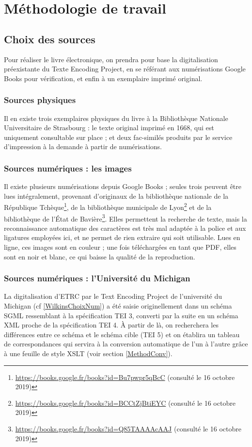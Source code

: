 \chapter{Méthodologie de travail}\label{Method}
\section{Choix des sources}\label{MethodSource}
Pour réaliser le livre électronique, on prendra pour base la digitalisation préexistante du Texte Encoding Project, en se référant aux numérisations Google Books pour vérification, et enfin à un exemplaire imprimé original.
\subsection{Sources physiques}
Il en existe trois exemplaires physiques du livre à la Bibliothèque Nationale Universitaire de Strasbourg : le texte original imprimé en 1668, qui est uniquement consultable sur place ; et deux fac-similés produits par le service d'impression à la demande à partir de numérisations.
\subsection{Sources numériques : les images}
Il existe plusieurs numérisations depuis Google Books ; seules trois peuvent être lues intégralement, provenant d'originaux de la bibliothèque nationale de la République Tchèque\footnote{\url{https://books.google.fr/books?id=Bu7pwpr5qBcC} (consulté le 16 octobre 2019)}, de la bibliothèque municipale de Lyon\footnote{\url{https://books.google.fr/books?id=BCCtZjBtiEYC} (consulté le 16 octobre 2019)} et de la bibliothèque de l'État de Bavière\footnote{\url{https://books.google.fr/books?id=Q85TAAAAcAAJ} (consulté le 16 octobre 2019)}.
Elles permettent la recherche de texte, mais la reconnaissance automatique des caractères est très mal adaptée à la police et aux ligatures employées ici, et ne permet de rien extraire qui soit utilisable.
Lues en ligne, ces images sont en couleur ; une fois téléchargées en tant que PDF, elles sont en noir et blanc, ce qui baisse la qualité de la reproduction.
\subsection{Sources numériques : l'Université du Michigan}
La digitalisation d'ETRC par le Text Encoding Project de l'université du Michigan (cf \ref{WilkinsChoixNum}) a été saisie originellement dans un schéma SGML ressemblant à la spécification TEI 3, converti par la suite en un schéma XML proche de la spécification TEI 4.
À partir de là, on recherchera les différences entre ce schéma et le schéma cible (TEI 5) et on établira un tableau de correspondances qui servira à la conversion automatique de l'un à l'autre grâce à une feuille de style XSLT (voir section \ref{MethodConv}).
